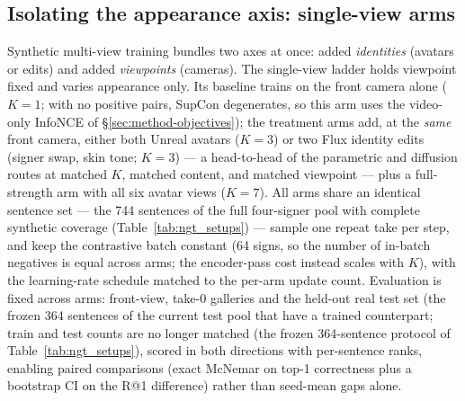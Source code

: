 \subsection{Isolating the appearance axis: single-view arms}
\label{sec:ngt-single-view}
Synthetic multi-view training bundles two axes at once: added
\emph{identities} (avatars or edits) and added \emph{viewpoints} (cameras).
The single-view ladder holds viewpoint fixed and varies appearance
only. Its baseline trains on the front camera alone ($K{=}1$; with no
positive pairs, SupCon degenerates, so this arm uses the video-only
InfoNCE of \S\ref{sec:method-objectives});
the treatment arms add, at the \emph{same} front camera, either both Unreal
avatars ($K{=}3$) or two Flux identity edits (signer swap, skin tone;
$K{=}3$) --- a head-to-head of the parametric and diffusion routes at
matched $K$, matched content, and matched viewpoint --- plus a
full-strength arm with all six avatar views ($K{=}7$). All arms share an
identical sentence set --- the 744 sentences of the full four-signer pool
with complete synthetic coverage
(Table~\ref{tab:ngt_setups}) --- sample one repeat take per step, and keep the
contrastive batch constant (64 signs, so the number of in-batch negatives is
equal across arms; the encoder-pass cost instead scales with $K$), with the
learning-rate schedule matched to the per-arm update count.
Evaluation is fixed across arms: front-view, take-0 galleries and the
held-out real test set (the frozen 364 sentences of the current test pool
that have a trained counterpart; train and test counts are no longer
matched (the frozen 364-sentence protocol of Table~\ref{tab:ngt_setups}), scored in both directions with
per-sentence ranks, enabling paired comparisons (exact McNemar on top-1 correctness plus
a bootstrap CI on the R@1 difference) rather than seed-mean gaps alone.
